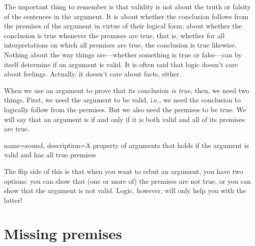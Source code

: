 The important thing to remember is that validity is not about the truth or falsity of the sentences in the argument. It is about whether the conclusion follows from the premises of the argument in virtue of their logical form; about whether the conclusion is true whenever the premises are true, that is, whether for all interpretations on which all premises are true, the conclusion is true likewise. Nothing about the way things are---whether something is true or false---can by itself determine if an argument is valid. It is often said that logic doesn't care about feelings. Actually, it doesn't care about facts, either.

When we use an argument to prove that its conclusion \emph{is true}, then, we need two things. First, we need the argument to be valid, i.e., we need the conclusion to logically follow from the premises. But we also need the premises to be true. We will say that an argument is  if and only if it is both valid and all of its premises are true.

{
name=sound,
description={A property of arguments that holds if the argument is valid and has all true premises}
}

The flip side of this is that when you want to rebut an argument, you have two options: you can show that (one or more of) the premises are not true, or you can show that the argument is not valid.  Logic, however, will only help you with the latter!





\section{Missing premises}


